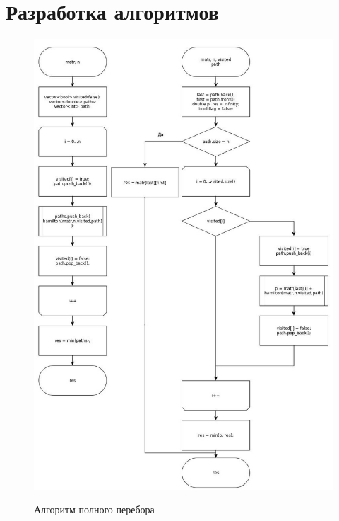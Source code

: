 \documentclass[a4paper,12pt]{report}
\begin{document}
	\section{Разработка алгоритмов}
		\begin{figure}[h!]
			\begin{center}
				{\includegraphics[scale = 0.32]{fullper.jpg}}%
				\caption{Алгоритм полного перебора}
				\label{ris:full}
			\end{center}
		\end{figure}
		
		\newpage			
		
\end{document}
